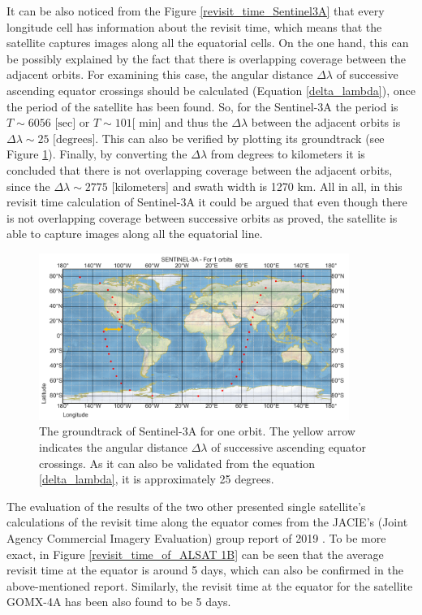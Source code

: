It can be also noticed from the Figure \ref{revisit_time_Sentinel3A} that every longitude cell has information about the revisit time, which means that the satellite captures images along all the equatorial cells. On the one hand, this can be possibly explained by the fact that there is overlapping coverage between the adjacent orbits. For examining this case, the angular distance $\Delta \lambda$ of successive ascending equator crossings should be calculated (Equation \ref{delta_lambda}), once the period of the satellite has been found. So, for the Sentinel-3A the period is $T \sim 6056 \text{ [sec]}$ or $T \sim 101 \text{[ min]}$ and thus the $\Delta \lambda$ between the adjacent orbits is $\Delta \lambda \sim 25\text{ [degrees]}$. This can also be verified by plotting its groundtrack (see Figure \ref{Sentinel_3A_delta_lambda}). Finally, by converting the $\Delta \lambda$ from degrees to kilometers it is concluded that there is not overlapping coverage between the adjacent orbits, since the $\Delta \lambda \sim 2775\text{ [kilometers]}$ and swath width is 1270 km. All in all, in this revisit time calculation of Sentinel-3A it could be argued that even though there is not overlapping coverage between successive orbits as proved, the satellite is able to capture images along all the equatorial line. 

\begin{figure}
\centering
\includegraphics[width=0.9\textwidth]{Images/Sentinel_3A_delta_lambda.png}\caption{The groundtrack of Sentinel-3A for one orbit. The yellow arrow indicates the angular distance $\Delta \lambda$ of successive ascending equator crossings. As it can also be validated from the equation \ref{delta_lambda}, it is approximately 25 degrees.}
\label{Sentinel_3A_delta_lambda}
\end{figure}

\bigskip

The evaluation of the results of the two other presented single satellite's calculations of the revisit time along the equator comes from the JACIE's (Joint Agency Commercial Imagery Evaluation) group report of 2019 \cite{Christopherson}. To be more exact, in Figure \ref{revisit_time_of_ALSAT 1B} can be seen that the average revisit time at the equator is around 5 days, which can also be confirmed in the above-mentioned report. Similarly, the revisit time at the equator for the satellite GOMX-4A has been also found to be 5 days.

